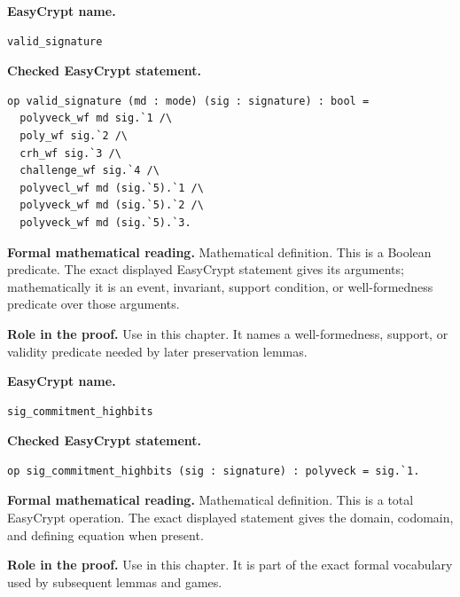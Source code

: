 \begin{formaldefinition}
\noindent\textbf{EasyCrypt name.}
\begin{lstlisting}[language=EasyCrypt,basicstyle=\ttfamily\scriptsize]
valid_signature
\end{lstlisting}
\noindent\textbf{Checked EasyCrypt statement.}
\begin{lstlisting}[language=EasyCrypt,basicstyle=\ttfamily\scriptsize]
op valid_signature (md : mode) (sig : signature) : bool =
  polyveck_wf md sig.`1 /\
  poly_wf sig.`2 /\
  crh_wf sig.`3 /\
  challenge_wf sig.`4 /\
  polyvecl_wf md (sig.`5).`1 /\
  polyveck_wf md (sig.`5).`2 /\
  polyveck_wf md (sig.`5).`3.
\end{lstlisting}
\noindent\textbf{Formal mathematical reading.}
Mathematical definition. This is a Boolean predicate.  The exact displayed EasyCrypt statement gives its arguments; mathematically it is an event, invariant, support condition, or well-formedness predicate over those arguments.

\noindent\textbf{Role in the proof.}
Use in this chapter. It names a well-formedness, support, or validity predicate needed by later preservation lemmas.

\end{formaldefinition}

\begin{formaldefinition}[EasyCrypt line 3051]
\noindent\textbf{EasyCrypt name.}
\begin{lstlisting}[language=EasyCrypt,basicstyle=\ttfamily\scriptsize]
sig_commitment_highbits
\end{lstlisting}
\noindent\textbf{Checked EasyCrypt statement.}
\begin{lstlisting}[language=EasyCrypt,basicstyle=\ttfamily\scriptsize]
op sig_commitment_highbits (sig : signature) : polyveck = sig.`1.
\end{lstlisting}
\noindent\textbf{Formal mathematical reading.}
Mathematical definition. This is a total EasyCrypt operation.  The exact displayed statement gives the domain, codomain, and defining equation when present.

\noindent\textbf{Role in the proof.}
Use in this chapter. It is part of the exact formal vocabulary used by subsequent lemmas and games.

\end{formaldefinition}

